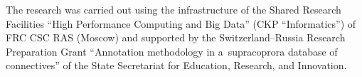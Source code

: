 



\vspace*{-21pt}

\Ack

\vspace*{-4pt}

\noindent
The research was carried out using the infrastructure of the Shared Research Facilities 
``High Performance Computing and Big Data'' (CKP ``Informatics'') of FRC CSC RAS 
(Moscow) and supported by the Switzerland--Russia Research Preparation Grant 
``Annotation methodology in a~supracoprora database of connectives'' of the State 
Secretariat for Education, Research, and Innovation.



\vspace*{-2pt}

